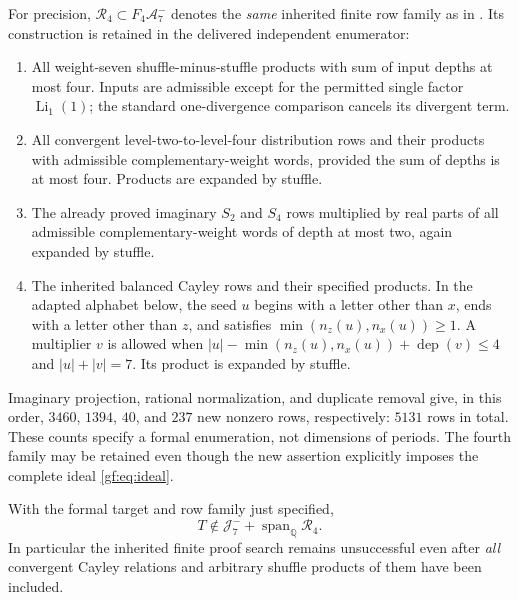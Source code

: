 For precision, $\mathcal R_4\subset F_4\mathcal A_7^-$ denotes the
\emph{same} inherited finite row family as in \cite{gf:Bounded}. Its
construction is retained in the delivered independent enumerator:
\begin{enumerate}
\item All weight-seven shuffle-minus-stuffle products with sum of input
      depths at most four. Inputs are admissible except for the permitted
      single factor $\operatorname{Li}_1(1)$; the standard one-divergence
      comparison cancels its divergent term.
\item All convergent level-two-to-level-four distribution rows and their
      products with admissible complementary-weight words, provided the
      sum of depths is at most four. Products are expanded by stuffle.
\item The already proved imaginary $S_2$ and $S_4$ rows multiplied by real
      parts of all admissible complementary-weight words of depth at most
      two, again expanded by stuffle.
\item The inherited balanced Cayley rows and their specified products.
      In the adapted alphabet below, the seed $u$ begins with a letter
      other than $x$, ends with a letter other than $z$, and satisfies
      $\min(n_z(u),n_x(u))\geq1$. A multiplier $v$ is allowed when
      $|u|-\min(n_z(u),n_x(u))+\operatorname{dep}(v)\leq4$ and
      $|u|+|v|=7$. Its product is expanded by stuffle.
\end{enumerate}
Imaginary projection, rational normalization, and duplicate removal give,
in this order, $3460$, $1394$, $40$, and $237$ new nonzero rows, respectively:
$5131$ rows in total. These counts specify a formal enumeration, not
dimensions of periods. The fourth family may be retained even though the
new assertion explicitly imposes the complete ideal \eqref{gf:eq:ideal}.

\begin{theorem}
\label{gf:thm:main}
With the formal target and row family just specified,
\begin{equation}
 \boxed{\qquad
 T\notin\mathcal J_7^-+\operatorname{span}_{\mathbb Q}\mathcal R_4.
 \qquad}
 \label{gf:eq:nonmembership}
\end{equation}
In particular the inherited finite proof search remains unsuccessful even
after \emph{all} convergent Cayley relations and arbitrary shuffle products
of them have been included.
\end{theorem}

